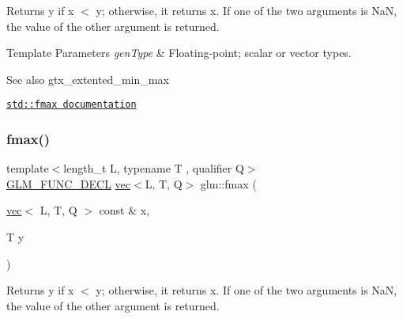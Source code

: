 Returns y if x $<$ y; otherwise, it returns x. If one of the two arguments is NaN, the value of the other argument is returned.


\begin{DoxyTemplParams}{Template Parameters}
{\em gen\+Type} & Floating-\/point; scalar or vector types.\\
\hline
\end{DoxyTemplParams}
\begin{DoxySeeAlso}{See also}
gtx\+\_\+extented\+\_\+min\+\_\+max 

\href{http://en.cppreference.com/w/cpp/numeric/math/fmax}{\tt std\+::fmax documentation} 
\end{DoxySeeAlso}
\mbox{\label{group__gtx__extended__min__max_gab380df808a15a6a23993e3475d1b94d2}} 
\subsubsection{\texorpdfstring{fmax()}{fmax()}\hspace{0.1cm}{\footnotesize\ttfamily [2/3]}}
{\footnotesize\ttfamily template$<$length\+\_\+t L, typename T , qualifier Q$>$ \\
\mbox{\hyperlink{setup_8hpp_ab2d052de21a70539923e9bcbf6e83a51}{G\+L\+M\+\_\+\+F\+U\+N\+C\+\_\+\+D\+E\+CL}} \mbox{\hyperlink{structglm_1_1vec}{vec}}$<$L, T, Q$>$ glm\+::fmax (\begin{DoxyParamCaption}\item[{\mbox{\hyperlink{structglm_1_1vec}{vec}}$<$ L, T, Q $>$ const \&}]{x,  }\item[{T}]{y }\end{DoxyParamCaption})}

Returns y if x $<$ y; otherwise, it returns x. If one of the two arguments is NaN, the value of the other argument is returned.


